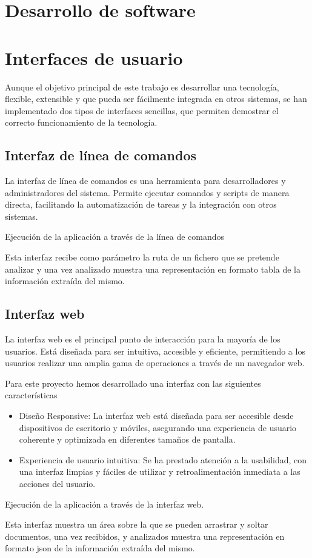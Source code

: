 \section{Desarrollo de software}

\section{Interfaces de usuario}
Aunque el objetivo principal de este trabajo es desarrollar una tecnología, flexible, extensible y que pueda ser
fácilmente integrada en otros sistemas, se han implementado dos tipos de interfaces sencillas, que permiten demostrar el
correcto funcionamiento de la tecnología.

\subsection*{Interfaz de línea de comandos}
La interfaz de línea de comandos es una herramienta para desarrolladores y administradores del sistema. Permite ejecutar
comandos y scripts de manera directa, facilitando la automatización de tareas y la integración con otros sistemas.


Ejecución de la aplicación a través de la línea de comandos

Esta interfaz recibe como parámetro la ruta de un fichero que se pretende analizar y una vez analizado muestra una
representación en formato tabla de la información extraída del mismo.

\subsection*{Interfaz web}
La interfaz web es el principal punto de interacción para la mayoría de los usuarios. Está diseñada para ser intuitiva,
accesible y eficiente, permitiendo a los usuarios realizar una amplia gama de operaciones a través de un navegador web.

Para este proyecto hemos desarrollado una interfaz con las siguientes características

\begin{itemize}
    \item
    Diseño Responsive: La interfaz web está diseñada para ser accesible desde dispositivos de escritorio y móviles,
    asegurando una experiencia de usuario coherente y optimizada en diferentes tamaños de pantalla.
    \item
    Experiencia de usuario intuitiva: Se ha prestado atención a la usabilidad, con una interfaz limpias y fáciles de
    utilizar y retroalimentación inmediata a las acciones del usuario.
\end{itemize}


Ejecución de la aplicación a través de la interfaz web.

Esta interfaz muestra un área sobre la que se pueden arrastrar y soltar documentos, una vez recibidos, y analizados
muestra una representación en formato json de la información extraída del mismo.
